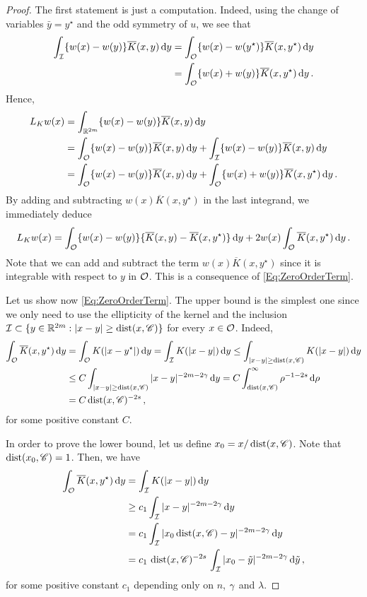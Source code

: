 \begin{proof}
	The first statement is just a computation. Indeed,  using the change of variables  $\bar{y} = y^\star$ and the odd symmetry of $u$, we see that
	\begin{align*}
	\int_{\mathcal{I}}  \{w(x) - w(y) \} \overline{K}(x, y)\,\mathrm{d} y &= \int_{\mathcal{O}} \{w(x) - w(y^\star) \}\overline{K}(x, y^\star)\,\mathrm{d} y \\
	&= \int_{\mathcal{O}} \{w(x) + w(y) \}\overline{K}(x, y^\star)\,\mathrm{d} y\,.
	\end{align*}
	Hence,
	\begin{align*}
	L_K w (x) &= \int_{\mathbb{R}^{2m}}  \{w(x) - w(y) \} \overline{K}(x, y)\,\mathrm{d} y \\
	&= \int_{\mathcal{O}}  \{w(x) - w(y) \} \overline{K}(x, y)\,\mathrm{d} y +\int_{\mathcal{I}}  \{w(x) - w(y) \} \overline{K}(x, y)\,\mathrm{d} y \\
	&= \int_{\mathcal{O}} \{w(x) - w(y) \} \overline{K}(x, y) \,\mathrm{d} y +  \int_{\mathcal{O}} \{w(x) + w(y) \} \overline{K}(x, y^\star) \,\mathrm{d} y \,.
	\end{align*}
	By adding and subtracting $w(x)\overline{K}(x, y^\star)$ in the last integrand, we immediately deduce
	$$
	L_K w (x) =  \int_{\mathcal{O}} \{w(x) - w(y) \} \{\overline{K}(x, y) - \overline{K}(x, y^\star)  \} \,\mathrm{d} y +  2 w(x) \int_{\mathcal{O}} \overline{K}(x, y^\star) \,\mathrm{d} y\,.
	$$
	Note that we can add and subtract the term $w(x)\overline{K}(x, y^\star)$  since it is integrable with respect to $y$ in $\mathcal{O}$. This is a consequence of \eqref{Eq:ZeroOrderTerm}. 
	
	Let us show now \eqref{Eq:ZeroOrderTerm}. The upper bound is the simplest one since we only need to use the ellipticity of the kernel and the inclusion $\mathcal{I} \subset \{y\in\mathbb{R}^{2m}:|x-y|\geq \operatorname{dist}(x,\mathscr{C})\}$ for every $x\in \mathcal{O}$. Indeed,
	\begin{align*}
	\int_{\mathcal{O}} \overline{K}(x, y^\star) \,\mathrm{d} y &=  \int_{\mathcal{O}} K(|x-y^\star|) \,\mathrm{d} y = \int_{\mathcal{I}} K(|x-y|) \,\mathrm{d} y \leq \int_{|x-y|\geq \operatorname{dist}(x,\mathscr{C})} K(|x-y|) \,\mathrm{d} y \\
	&\leq C \int_{|x-y|\geq \operatorname{dist}(x,\mathscr{C})} |x-y|^{-2m-2\gamma} \,\mathrm{d} y = C \int_{\operatorname{dist}(x,\mathscr{C})}^\infty \rho^{-1-2s} \,\mathrm{d} \rho \\
	&= C \operatorname{dist}(x,\mathscr{C})^{-2s}\,,
	\end{align*}
	for some positive constant $C$.
	
	In order to prove the lower bound, let us define $x_0 = x/\operatorname{dist}(x,\mathscr{C})$. Note that $\operatorname{dist} (x_0, \mathscr{C}) = 1$. Then, we have
	\begin{align*}
	\int_{\mathcal{O}} \overline{K}(x, y^\star) \,\mathrm{d} y &=  \int_{\mathcal{I}} K(|x-y|) \,\mathrm{d} y \\
	&\geq c_1 \int_{\mathcal{I}} |x-y|^{-2m-2\gamma} \,\mathrm{d} y \\
	&= c_1 \int_{\mathcal{I}} |x_0\operatorname{dist}(x,\mathscr{C})-y|^{-2m-2\gamma} \,\mathrm{d} y \\
	&= c_1 \,\operatorname{dist}(x,\mathscr{C})^{-2s}\, \int_{\mathcal{I}} |x_0-\tilde{y}|^{-2m-2\gamma} \,\mathrm{d} \tilde{y}\,,
	\end{align*}
	for some positive constant $c_1$ depending only on $n$, $\gamma$ and $\lambda$.
	

\end{proof}
